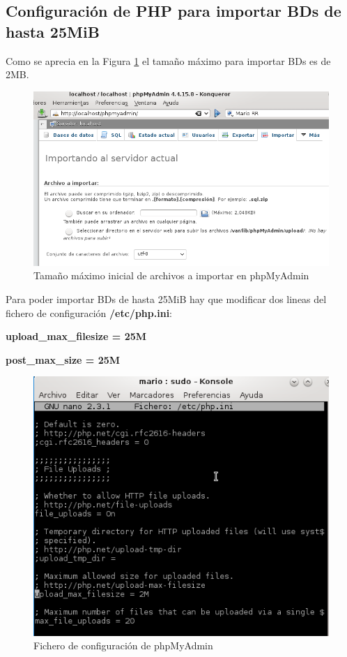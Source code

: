\subsection{Configuración de PHP para importar BDs de
	hasta 25MiB}
\cite{enlace26}

Como se aprecia en la Figura \ref{fig:figura55} el tamaño máximo para importar BDs es de 2MB.

\begin{figure}[H] %
	\centering
	\includegraphics[scale=0.6]{figuras/figura55.png} 
	\caption{Tamaño máximo inicial de archivos a importar en phpMyAdmin} 
	\label{fig:figura55}
\end{figure}

\newpage

Para poder importar BDs de hasta 25MiB hay que modificar dos lineas del fichero de configuración \textbf{/etc/php.ini}:

\textbf{upload\_max\_filesize = 25M}

\textbf{post\_max\_size = 25M}

\begin{figure}[H] %
	\centering
	\includegraphics[scale=0.9]{figuras/figura54.png} 
	\caption{Fichero de configuración de phpMyAdmin} 
	\label{fig:figura54}
\end{figure}

